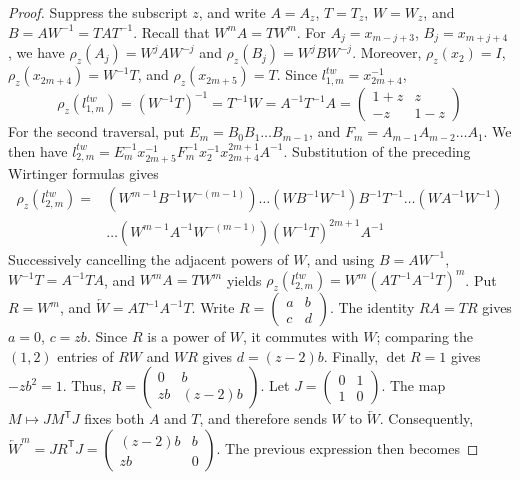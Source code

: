 \documentclass{article}
\theoremstyle{plain}
\theoremstyle{definition}
\theoremstyle{plain}
\theoremstyle{plain}
\theoremstyle{plain}
\theoremstyle{remark}
\theoremstyle{remark}
\theoremstyle{plain}
\theoremstyle{plain}
\theoremstyle{plain}
\theoremstyle{plain}
\begin{document}
\begin{proof}
Suppress the subscript $z$, and write $A = A_z$, $T = T_z$, $W = W_z$, and $B = AW^{-1} = TAT^{-1}$. Recall that $W^mA = TW^m$. For $A_j = x_{m-j+3}$, $B_j = x_{m+j+4}$, we have $\rho_z(A_j) = W^jAW^{-j}$ and $\rho_z(B_j) = W^jBW^{-j}$. Moreover, $\rho_z(x_2) = I$, $\rho_z(x_{2m+4}) = W^{-1}T$, and $\rho_z(x_{2m+5})=T$. Since $l_{1,m}^{tw}=x_{2m+4}^{-1}$, 
\begin{equation*}
	\rho_z(l_{1,m}^{tw}) = (W^{-1}T)^{-1}=T^{-1}W=A^{-1}T^{-1}A=\begin{pmatrix}1+z&z\\-z&1-z\end{pmatrix}
\end{equation*}
For the second traversal, put $E_m=B_0B_1\dots B_{m-1}$, and $F_m=A_{m-1}A_{m-2}\dots A_1$. We then have $l_{2,m}^{tw}=E_m^{-1}x_{2m+5}^{-1}F_m^{-1}x_2^{-1}x_{2m+4}^{2m+1}A^{-1}$. Substitution of the preceding Wirtinger formulas gives 
\begin{align*}
	 \rho_z(l_{2,m}^{tw}) = &(W^{m-1}B^{-1}W^{-(m-1)})\dots(WB^{-1}W^{-1})B^{-1}T^{-1}\dots(WA^{-1}W^{-1})\\&\dots(W^{m-1}A^{-1}W^{-(m-1)})(W^{-1}T)^{2m+1}A^{-1}
\end{align*}
Successively cancelling the adjacent powers of $W$, and using $B = AW^{-1}$, $W^{-1}T=A^{-1}TA$, and $W^mA=TW^m$ yields $\rho_z(l_{2,m}^{tw})=W^m(AT^{-1}A^{-1}T)^m$. Put $R=W^m$, and $\overleftarrow W = AT^{-1}A^{-1}T$. Write $R = \left(\begin{smallmatrix}a&b\\c&d\end{smallmatrix}\right)$. The identity $RA=TR$ gives $a=0$, $c=zb$. Since $R$ is a power of $W$, it commutes with $W$; comparing the $(1, 2)$ entries of $RW$ and $WR$ gives $d=(z-2)b$. Finally, $\det R = 1$ gives $-zb^2=1$. Thus, $R=\left(\begin{smallmatrix}0&b\\zb&(z-2)b\end{smallmatrix}\right)$. Let $J=\left(\begin{smallmatrix}0&1\\1&0\end{smallmatrix}\right)$. The map $M \mapsto JM^{\mathsf T}J$ fixes both $A$ and $T$, and therefore sends $W$ to $\overleftarrow W$. Consequently, $\overleftarrow W^m=JR^{\mathsf T}J=\left(\begin{smallmatrix}(z-2)b&b\\zb&0\end{smallmatrix}\right)$. The previous expression then becomes

\end{proof}
\end{document}
